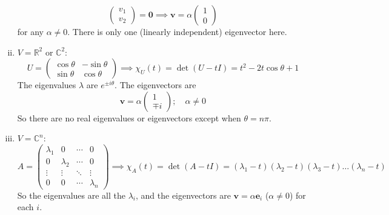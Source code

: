 \documentclass{article}
\begin{document}
\begin{enumerate}[(i)]
\[\begin{pmatrix}
			v_1 \\ v_2
		\end{pmatrix} = \bm 0 \implies \bm v = \alpha\begin{pmatrix}
			1 \\ 0
		\end{pmatrix} \]
		for any $\alpha \neq 0$. There is only one (linearly independent) eigenvector here.
		\item $V = \mathbb R^2$ or $\mathbb C^2$:
		\[ U = \begin{pmatrix}
			\cos\theta & -\sin\theta \\ \sin\theta & \cos\theta
		\end{pmatrix} \implies \chi_U(t) = \det(U - tI) = t^2 - 2t\cos\theta + 1 \]
		The eigenvalues $\lambda$ are $e^{\pm i \theta}$. The eigenvectors are
		\[ \bm v = \alpha \begin{pmatrix}
			1 \\ \mp i
		\end{pmatrix};\quad \alpha \neq 0 \]
		So there are no real eigenvalues or eigenvectors except when $\theta = n \pi$.
		\item $V = \mathbb C^n$:
		\[ A = \begin{pmatrix}
			\lambda_1 & 0 & \cdots & 0 \\
			0 & \lambda_2 & \cdots & 0 \\
			\vdots & \vdots & \ddots & \vdots \\
			0 & 0 & \cdots & \lambda_n
		\end{pmatrix} \implies \chi_A(t) = \det(A - tI) = (\lambda_1 - t)(\lambda_2 - t)(\lambda_3 - t)\dots(\lambda_n - t) \]
		So the eigenvalues are all the $\lambda_i$, and the eigenvectors are $\bm v = \alpha \bm e_i$ ($\alpha \neq 0$) for each $i$.
	\end{enumerate}
\end{document}
